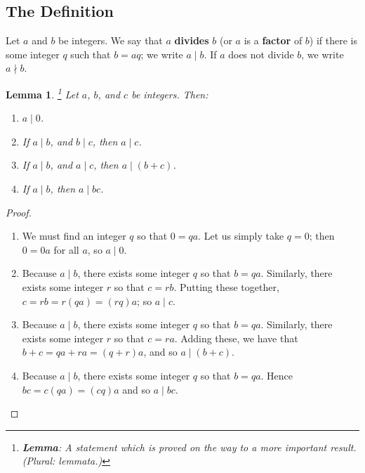 \documentclass[a4paper,leqno]{article}
\numberwithin{equation}{section}
\newtheorem{lem}[equation]{Lemma}
\theoremstyle{definition}
\theoremstyle{remark}
\newcommand{\df}[1]{\textbf{#1}}
\begin{document}
\subsection{The Definition}
Let $ a $ and $ b $ be integers. We say that $ a $ \df{divides} $ b $ (or $ a $ is a \df{factor} of $ b $) if there is some integer $ q $ such
that $ b = aq $; we write $ a \mid b $. If $ a $ does not divide $ b $, we write $ a \nmid b $.
\begin{lem}\footnote{\df{Lemma}: A statement which is proved on the way to a more important result. (Plural: lemmata.)}\leavevmode
  Let $ a $, $ b $, and $ c $ be integers. Then:
  \begin{enumerate}
    \item $ a \mid 0 $.
    \item If $ a \mid b $, and $ b \mid c $, then $ a \mid c $.
    \item If $ a \mid b $, and $ a \mid c $, then $ a \mid (b + c) $.
    \item If $ a \mid b $, then $ a \mid bc $.
  \end{enumerate}
\end{lem}
\begin{proof}\leavevmode
  \begin{enumerate}
    \item We must find an integer $ q $ so that $ 0 = qa $. Let us simply take $ q = 0 $; then $ 0 = 0a $ for all $ a $, so $ a \mid 0 $.
    \item Because $ a \mid b $, there exists some integer $ q $ so that $ b = qa $. Similarly, there exists some integer $ r $ so that $ c = rb $.
          Putting these together, $ c = rb = r(qa) = (rq)a $; so $ a \mid c $.
    \item Because $ a \mid b $, there exists some integer $ q $ so that $ b = qa $. Similarly, there exists some integer $ r $ so that $ c = ra $.
          Adding these, we have that $ b + c = qa + ra = (q + r)a $, and so $ a \mid (b+c) $.
    \item Because $ a \mid b $, there exists some integer $ q $ so that $ b = qa $. Hence $ bc = c(qa) = (cq)a $ and so $ a \mid bc $.
  \end{enumerate}
\end{proof}
\end{document}
